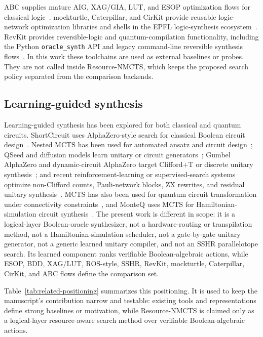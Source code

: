 \documentclass[11pt]{article}
\newcommand{\method}{Resource-NMCTS}
\newcommand{\mcts}{\ensuremath{\mathrm{MCTS}}}
\begin{document}
ABC supplies mature AIG, XAG/GIA, LUT, and ESOP optimization flows for
classical logic~\cite{brayton2010abc}.  mockturtle, Caterpillar, and CirKit provide reusable
logic-network optimization libraries and shells in the EPFL logic-synthesis
ecosystem~\cite{soeken2018epfl,mockturtle,caterpillar,cirkit}.  RevKit provides
reversible-logic and quantum-compilation functionality,
including the Python \texttt{oracle\_synth} API and legacy command-line
reversible synthesis flows~\cite{soeken2012revkit,revkit}.  In this work these
toolchains are used as external baselines or probes.  They are not called
inside \method{}, which keeps the proposed search policy separated from the
comparison backends.

\subsection{Learning-guided synthesis}

Learning-guided synthesis has been explored for both classical and quantum
circuits.  ShortCircuit uses AlphaZero-style search for classical Boolean
circuit design~\cite{tsaras2024shortcircuit}.  Nested \mcts{} has been used for
automated ansatz and circuit design~\cite{wang2023nestedmcts}; QSeed and
diffusion models learn unitary or circuit generators~\cite{weiden2023qseed,furrutter2024diffusion};
Gumbel AlphaZero and dynamic-circuit AlphaZero target Clifford+T or discrete
unitary synthesis~\cite{rietsch2024unitary,valcarce2025dynamic}; and recent
reinforcement-learning or supervised-search systems optimize non-Clifford
counts, Pauli-network blocks, ZX rewrites, and residual unitary
synthesis~\cite{kremer2025nonclifford,dubal2025paulinetwork,riu2025rlzx,theissinger2026beyondrl}.
\mcts{} has also been used for quantum circuit transformation under
connectivity constraints~\cite{zhou2022qctmcts}, and MonteQ uses \mcts{} for
Hamiltonian-simulation circuit synthesis~\cite{machiya2026monteq}.  The
present work is different in scope: it is a logical-layer Boolean-oracle
synthesizer, not a hardware-routing or transpilation method, not a
Hamiltonian-simulation scheduler, not a gate-by-gate unitary generator, not a
generic learned unitary compiler, and not an SSHR parallelotope search.  Its
learned component ranks verifiable Boolean-algebraic actions, while ESOP, BDD,
XAG/LUT, ROS-style, SSHR, RevKit, mockturtle, Caterpillar, CirKit, and ABC flows
define the comparison set.

Table~\ref{tab:related-positioning} summarizes this positioning.  It is used
to keep the manuscript's contribution narrow and testable: existing tools and
representations define strong baselines or motivation, while \method{} is
claimed only as a logical-layer resource-aware search method over verifiable
Boolean-algebraic actions.
\end{document}

